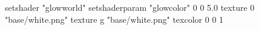 setshader "glowworld"
setshaderparam "glowcolor" 0 0 5.0
   texture 0 "base/white.png"
   texture g "base/white.png"
texcolor 0 0 1
